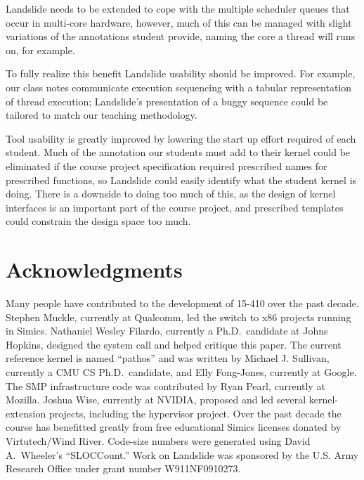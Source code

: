
Landslide needs to be extended to cope with the multiple scheduler queues that occur in multi-core hardware, however, much of this can be managed with slight variations of the annotations student provide, naming the core a thread will runs on, for example.

To fully realize this benefit Landslide usability should be improved.
For example, our class notes communicate execution sequencing with a tabular representation of thread execution; Landslide's presentation of a buggy sequence could be tailored to match our teaching methodology.

Tool usability is greatly improved by lowering the start up effort required of each student.
Much of the annotation our students must add to their kernel could be eliminated if the course project specification required prescribed names for prescribed functions, so Landslide could easily identify what the student kernel is doing.
There is a downside to doing too much of this, as the design of kernel interfaces is an important part of the course project, and prescribed templates could constrain the design space too much.





\section*{Acknowledgments}

Many people have contributed to the development of
15-410 over the past decade.
Stephen Muckle, currently at Qualcomm, led
the switch to x86 projects running in Simics.
Nathaniel Wesley Filardo,
currently a Ph.D.\ candidate at Johns Hopkins,
designed the  system call and helped critique this paper.
The current reference kernel is named ``pathos''
and was written by Michael J. Sullivan,
currently a CMU CS Ph.D.\ candidate,
and Elly Fong-Jones, currently at Google.
The SMP infrastructure code was contributed by
Ryan Pearl, currently at Mozilla.
Joshua Wise, currently at NVIDIA,
proposed and led several kernel-extension projects,
including the hypervisor project.
Over the past decade the course has benefitted
greatly from free educational Simics licenses
donated by Virtutech/Wind River.
Code-size numbers were generated using David A.\ Wheeler's
``SLOCCount.''
Work on Landslide was sponsored by the U.S. Army Research Office under grant number W911NF0910273.
